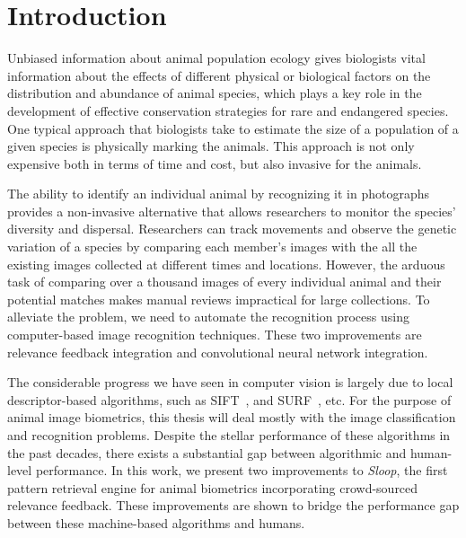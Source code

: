 
\chapter{Introduction}

Unbiased information about animal population ecology gives biologists vital
information about the effects of different physical or biological factors on
the distribution and abundance of animal species, which plays a key role in the
development of effective conservation strategies for rare and endangered
species. One typical approach that biologists take to estimate the size of a
population of a given species is physically marking the animals.
This approach is not only expensive both in terms of time and cost, but
also invasive for the animals.

The ability to identify an individual animal by recognizing it in photographs
provides a non-invasive alternative that allows researchers to monitor the
species' diversity and dispersal.  Researchers can track movements and observe
the genetic variation of a species by comparing each member's images with the
all the existing images collected at different times and locations. However,
the arduous task of comparing over a thousand images of every individual animal
and their potential matches makes manual reviews impractical for large
collections. To alleviate the problem, we need to automate the recognition
process using computer-based image recognition techniques.
These two improvements are relevance feedback integration and convolutional
neural network integration.

The considerable progress we have seen in computer vision is largely due to
local descriptor-based algorithms, such as SIFT~\cite{lowe04}, and
SURF~\cite{surf08}, etc.
For the purpose of animal image biometrics, this thesis will deal
mostly with the image classification and recognition problems. Despite the
stellar performance of these algorithms in the past decades, there exists a
substantial gap between algorithmic and human-level performance. In this work,
we present two improvements to \emph{Sloop}, the first pattern retrieval
engine for animal biometrics incorporating crowd-sourced relevance feedback.
These improvements are shown to bridge the performance gap between these
machine-based algorithms and humans.

